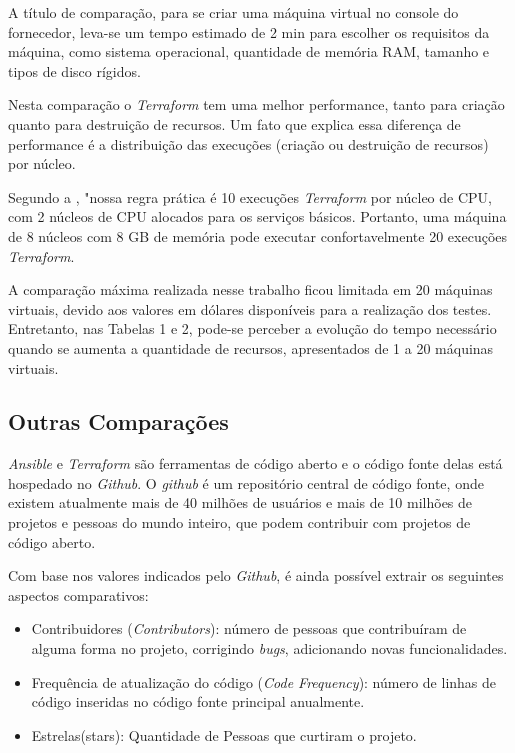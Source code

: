 A título de comparação, para se criar uma máquina virtual no console do fornecedor, leva-se um tempo estimado de 2 min para escolher os requisitos da máquina, como sistema operacional, quantidade de memória RAM, tamanho e tipos de disco rígidos. 

Nesta comparação o \textit{Terraform} tem uma melhor performance, tanto para criação quanto para destruição de recursos. Um fato que explica essa diferença de performance é a distribuição das execuções (criação ou destruição de recursos) por núcleo. 

Segundo a , "nossa regra prática é 10 execuções \textit{Terraform} por núcleo de CPU, com 2 núcleos de CPU alocados para os serviços básicos.  Portanto, uma máquina de 8 núcleos com 8 GB de memória pode executar confortavelmente 20 execuções \textit{Terraform}.

A comparação máxima realizada nesse trabalho ficou limitada em 20 máquinas virtuais, devido aos valores em dólares disponíveis para a realização dos testes. Entretanto, nas Tabelas 1 e 2, pode-se perceber a evolução do tempo necessário quando se aumenta a quantidade de recursos, apresentados de 1 a 20 máquinas virtuais.

\subsection{Outras Comparações}
\textit{Ansible} e \textit{Terraform} são ferramentas de código aberto e o código fonte delas está hospedado no \textit{Github}. O \textit{github} é um repositório central de código fonte, onde existem atualmente mais de 40 milhões de usuários e mais de 10 milhões de projetos e pessoas do mundo inteiro, que podem contribuir com projetos de código aberto. 

Com base nos valores indicados pelo \textit{Github}, é ainda possível extrair os seguintes aspectos comparativos: 

\begin{itemize}
    \item  Contribuidores (\textit{Contributors}): número de pessoas que contribuíram de alguma forma no projeto, corrigindo \textit{bugs}, adicionando novas funcionalidades.
     \item Frequência de atualização do código (\textit{Code Frequency}): número de linhas de código inseridas no código fonte principal anualmente. 
     \item Estrelas(stars): Quantidade de Pessoas que curtiram o projeto.
\end{itemize}

